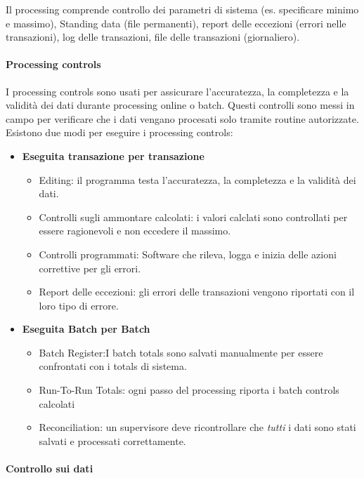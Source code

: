 Il processing comprende controllo dei parametri di sistema (es. specificare
minimo e massimo), Standing data (file permanenti), report delle eccezioni
(errori nelle transazioni), log delle transazioni, file delle transazioni
(giornaliero).

\paragraph{Processing controls}
I processing controls sono usati per assicurare
l'accuratezza, la completezza e la validità dei dati durante
processing online o batch. Questi controlli sono messi in campo
per verificare che i dati vengano procesati solo tramite routine
autorizzate. Esistono due modi per eseguire i processing controls:

\begin{itemize}
\item \textbf{Eseguita transazione per transazione}
\begin{itemize}
\item Editing: il programma testa l'accuratezza, la completezza
e la validità dei dati.
\item Controlli sugli ammontare calcolati: i valori calclati
sono controllati per essere ragionevoli e non eccedere il massimo.
\item Controlli programmati: Software che rileva, logga e inizia
delle azioni correttive per gli errori.
\item Report delle eccezioni: gli errori delle transazioni vengono
riportati con il loro tipo di errore.
\end{itemize}

\item \textbf{Eseguita Batch per Batch}

\begin{itemize}
\item Batch Register:I batch totals sono salvati manualmente per essere
confrontati con i totals di sistema. 
\item Run-To-Run Totals: ogni passo del processing riporta i batch
controls calcolati
\item Reconciliation: un supervisore deve ricontrollare che \emph{tutti}
i dati sono stati salvati e processati correttamente.
\end{itemize}
\end{itemize}
\paragraph{Controllo sui dati}

